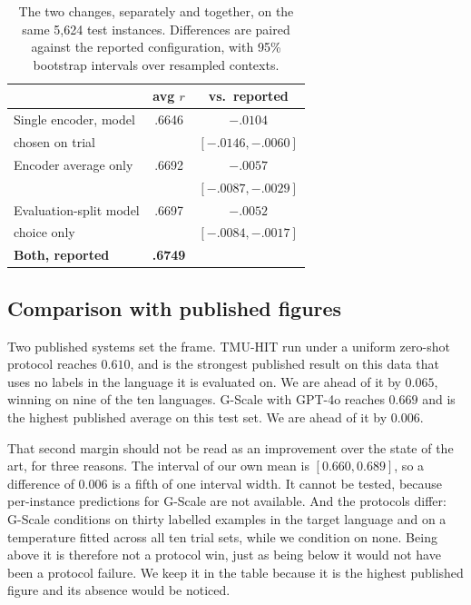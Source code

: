 \begin{table}[t]
\centering
\small
\begin{tabular}{lcc}
\toprule
 & avg $r$ & vs.\ reported \\
\midrule
Single encoder, model                 & .6646 & $-.0104$ \\
\quad chosen on trial                 &       & $[-.0146, -.0060]$ \\
\addlinespace[2pt]
Encoder average only                  & .6692 & $-.0057$ \\
                                      &       & $[-.0087, -.0029]$ \\
\addlinespace[2pt]
Evaluation-split model                & .6697 & $-.0052$ \\
\quad choice only                     &       & $[-.0084, -.0017]$ \\
\addlinespace[2pt]
\textbf{Both, reported}               & \textbf{.6749} & \\
\bottomrule
\end{tabular}
\caption{The two changes, separately and together, on the same 5{,}624
test instances. Differences are paired against the reported
configuration, with 95\% bootstrap intervals over resampled contexts.}
\label{tab:ablation}
\end{table}

\subsection{Comparison with published figures}
\label{sec:published}

Two published systems set the frame. TMU-HIT run under a uniform
zero-shot protocol reaches $0.610$, and is the strongest published
result on this data that uses no labels in the language it is
evaluated on. We are ahead of it by $0.065$, winning on nine of the ten
languages. G-Scale with GPT-4o reaches $0.669$ and is the highest
published average on this test set. We are ahead of it by $0.006$.

That second margin should not be read as an improvement over the state
of the art, for three reasons. The interval of our own mean is
$[0.660, 0.689]$, so a difference of $0.006$ is a fifth of one interval
width. It cannot be tested, because per-instance predictions for
G-Scale are not available. And the protocols differ: G-Scale conditions
on thirty labelled examples in the target language and on a temperature
fitted across all ten trial sets, while we condition on none. Being
above it is therefore not a protocol win, just as being below it would
not have been a protocol failure. We keep it in the table because it is
the highest published figure and its absence would be noticed.

